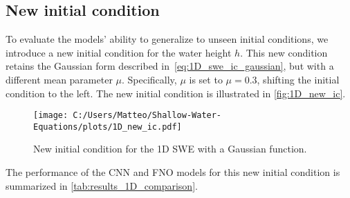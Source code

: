 \subsection*{New initial condition}
To evaluate the models' ability to generalize to unseen initial conditions, we introduce a new initial condition for the water height $h$.
This new condition retains the Gaussian form described in~\eqref{eq:1D_swe_ic_gaussian}, but with a different mean parameter $\mu$.
Specifically, $\mu$ is set to $\mu = 0.3$, shifting the initial condition to the left.
The new initial condition is illustrated in \autoref{fig:1D_new_ic}.
\begin{figure}[H]
    \centering
    \texttt{[image: C:/Users/Matteo/Shallow-Water-Equations/plots/1D\_new\_ic.pdf]}
    \caption{New initial condition for the 1D SWE with a Gaussian function.}\label{fig:1D_new_ic}
\end{figure}
The performance of the CNN and FNO models for this new initial condition is summarized in \autoref{tab:results_1D_comparison}.

